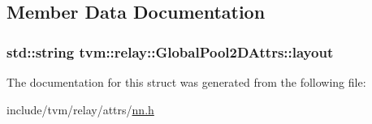 \subsection{Member Data Documentation}
\subsubsection[{\texorpdfstring{layout}{layout}}]{\setlength{\rightskip}{0pt plus 5cm}std\+::string tvm\+::relay\+::\+Global\+Pool2\+D\+Attrs\+::layout}\hypertarget{structtvm_1_1relay_1_1GlobalPool2DAttrs_a3f28790caca541684f5703a4be9b9789}{}\label{structtvm_1_1relay_1_1GlobalPool2DAttrs_a3f28790caca541684f5703a4be9b9789}


The documentation for this struct was generated from the following file\+:\begin{DoxyCompactItemize}
\item 
include/tvm/relay/attrs/\hyperlink{include_2tvm_2relay_2attrs_2nn_8h}{nn.\+h}\end{DoxyCompactItemize}
